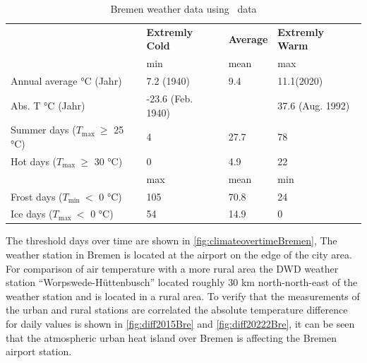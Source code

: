 \documentclass[12pt,a4paper, english,twoside]{article}
\begin{document}
  \begin{table}[ht]
    \centering
    \caption{Bremen weather data using~\cite{DWD2024a} data\label{tab:statsBremen}}
  \renewcommand{\arraystretch}{1.4}
    \begin{tabular}{p{3.5cm}p{2.5cm}lp{2.5cm}}
      \toprule
      & \textbf{Extremly Cold} & \textbf{Average} & \textbf{Extremly Warm} \\
      & min & mean & max \\
      \midrule
      Annual average °C \newline (Jahr)     &   7.2 \newline(1940)       & 9.4    & 11.1\newline (2020)      \\
      Abs. T °C \newline (Jahr)             & -23.6 \newline(Feb. 1940)  &        & 37.6 \newline(Aug. 1992) \\
      Summer days \newline($T_{\max}~\ge$  25 °C) & 4                    & 27.7   & 78 \\
      Hot days \newline($T_{\max}~\ge$  30 °C)    & 0                    & 4.9    & 22 \\
      \midrule
      & max & mean & min \\
      \midrule
      Frost days \newline($T_{\min}~<$  0 °C)     & 105         & 70.8   & 24 \\
      Ice days \newline($T_{\max}~<$  0 °C)       & 54          & 14.9   & 0  \\
      \bottomrule
    \end{tabular}
  \end{table}
%
   The threshold days over time are shown in \cref{fig:climateovertimeBremen},
   The weather station in Bremen is located at the airport on the edge of the city area. %
   For comparison of air temperature with a more rural area the \gls{DWD} weather station ``Worpswede-Hüttenbusch'' located roughly 30 km north-north-east of the weather station and is located in a rural area. 
   To verify that the measurements of the urban and rural stations are correlated the absolute temperature difference for daily values is shown in \cref{fig:diff2015Bre} and \cref{fig:diff20222Bre}, it can be seen that the atmospheric urban heat island over Bremen is affecting the Bremen airport station. 
\end{document}
